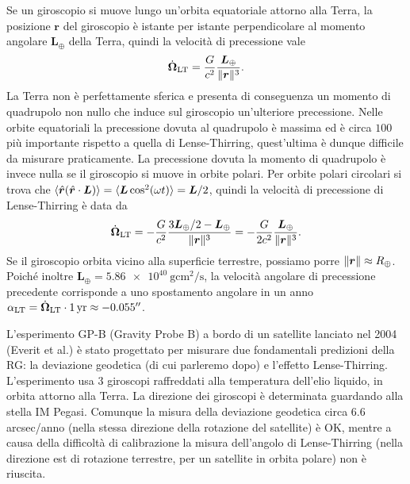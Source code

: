 Se un giroscopio si muove lungo un'orbita equatoriale attorno alla Terra, la
posizione $\bm{r}$ del giroscopio è istante per istante perpendicolare al
momento angolare $\bm{L}_{\oplus}$ della Terra, quindi la velocità di
precessione vale
\begin{equation}
  \dot{\bm{\Omega}}_{\textup{LT}} = \frac{G}{c^{2}}
  \frac{\bm{L}_{\oplus}}{\lVert\bm{r}\rVert^{3}}.
\end{equation}
La Terra non è perfettamente sferica e presenta di conseguenza un momento di
quadrupolo non nullo che induce sul giroscopio un'ulteriore precessione.  Nelle
orbite equatoriali la precessione dovuta al quadrupolo è massima ed è circa
$100$ più importante rispetto a quella di Lense-Thirring, quest'ultima è dunque
difficile da misurare praticamente.  La precessione dovuta la momento di
quadrupolo è invece nulla se il giroscopio si muove in orbite polari.  Per
orbite polari circolari si trova che
$\langle \hat{\bm{r}}(\hat{\bm{r}} \cdot \bm{L})\rangle = \langle \bm{L}
\cos^{2}(\omega t)\rangle = \bm{L}/2$,
quindi la velocità di precessione di Lense-Thirring è data da
\begin{equation}
  \dot{\bm{\Omega}}_{\textup{LT}} = -\frac{G}{c^{2}} \frac{3\bm{L}_{\oplus}/2 -
    \bm{L}_{\oplus}}{\lVert\bm{r}\rVert^{3}} = -\frac{G}{2c^{2}}
  \frac{\bm{L}_{\oplus}}{\lVert\bm{r}\rVert^{3}}.
\end{equation}
Se il giroscopio orbita vicino alla superficie terrestre, possiamo porre
$\lVert\bm{r}\rVert \approx R_{\oplus}$.  Poiché inoltre
$\bm{L}_{\oplus} = \SI{5.86e40}{\gram \centi\metre\squared \per\second}$, la
velocità angolare di precessione precedente corrisponde a uno spostamento
angolare in un anno
$\alpha_{\textup{LT}} = \dot{\bm{\Omega}}_{\textup{LT}} \cdot \SI{1}{yr} \approx
-\SI{0.055}{\arcsecond}$.

L'esperimento GP-B (Gravity Probe B) a bordo di un satellite lanciato nel 2004
(Everit et al.) è stato progettato per misurare due fondamentali predizioni
della RG: la deviazione geodetica (di cui parleremo dopo) e l'effetto
Lense-Thirring.  L'esperimento usa 3 giroscopi raffreddati alla temperatura
dell'elio liquido, in orbita attorno alla Terra.  La direzione dei giroscopi è
determinata guardando alla stella IM Pegasi.  Comunque la misura della
deviazione geodetica circa 6.6 arcsec/anno (nella stessa direzione della
rotazione del satellite) è OK, mentre a causa della difficoltà di calibrazione
la misura dell'angolo di Lense-Thirring (nella direzione est di rotazione
terrestre, per un satellite in orbita polare) non è riuscita.


